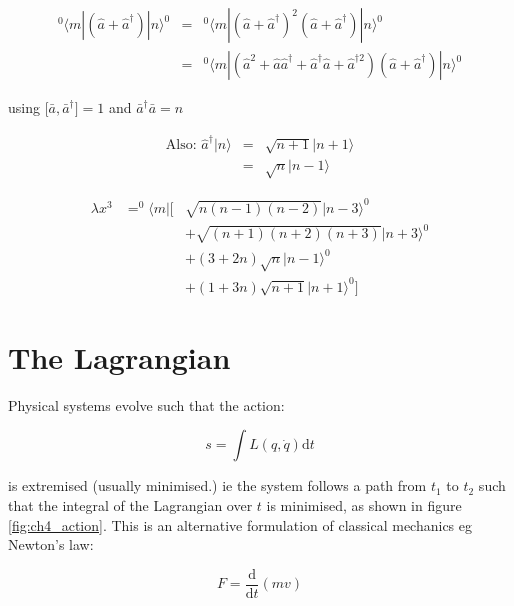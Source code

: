 \begin{eqnarray*}
  ^0\langle m|\left(\hat{a} + \hat{a}^{\dagger}\right)|n\rangle^0 & = & ^0\langle m|\left(\hat{a} + \hat{a}^{\dagger}\right)^2\left(\hat{a} + \hat{a}^{\dagger}\right)|n\rangle^0 \\
  & = & ^0\langle m|\left(\hat{a}^2 + \hat{a}\hat{a}^{\dagger} + \hat{a}^{\dagger}\hat{a}+\hat{a}^{\dagger 2}\right)\left(\hat{a} + \hat{a}^{\dagger}\right)|n\rangle^0
\end{eqnarray*}

using $\lbrack \bar{a},\bar{a}^{\dagger}\rbrack = 1$ and $\bar{a}^{\dagger}\bar{a} = n$

\begin{eqnarray*}
  \textrm{Also: }\hat{a}^{\dagger}|n\rangle & = & \sqrt{n + 1}|n + 1\rangle \\
  & = & \sqrt{n} |n - 1 \rangle
\end{eqnarray*}

\begin{eqnarray*}
  \lambda x^3 & = ^0\langle m| \lbrack & \sqrt{n(n-1)(n-2)}|n-3\rangle^0 \\
              &                        & + \sqrt{(n+1)(n+2)(n+3)}|n+3\rangle^0 \\
              &                        & + (3+2n)\sqrt{n}|n-1\rangle^0 \\
              &                        & + (1+3n)\sqrt{n+1}|n+1\rangle^0
                   \rbrack
\end{eqnarray*}

\section{The Lagrangian}

Physical systems evolve such that the action:

\[
  s = \int L(q,\dot{q})\mathrm{d}t
\]

is extremised (usually minimised.) ie the system follows a path from $t_1$ to $t_2$ such that the integral of the Lagrangian over $t$ is minimised, as shown in figure \ref{fig:ch4_action}.  This is an alternative formulation of classical mechanics eg Newton's law:

\[
  F = \frac{\mathrm{d}}{\mathrm{d}t}\left(mv\right)
\]

